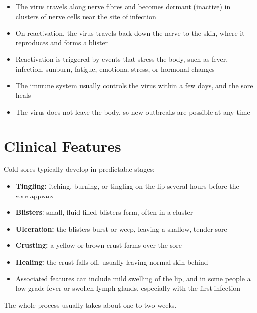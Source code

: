 \begin{itemize}
    \item The virus travels along nerve fibres and becomes dormant (inactive) in clusters of nerve cells near the site of infection
    \item On reactivation, the virus travels back down the nerve to the skin, where it reproduces and forms a blister
    \item Reactivation is triggered by events that stress the body, such as fever, infection, sunburn, fatigue, emotional stress, or hormonal changes
    \item The immune system usually controls the virus within a few days, and the sore heals
    \item The virus does not leave the body, so new outbreaks are possible at any time
\end{itemize}

\section*{Clinical Features}
Cold sores typically develop in predictable stages:

\begin{itemize}
    \item \textbf{Tingling:} itching, burning, or tingling on the lip several hours before the sore appears
    \item \textbf{Blisters:} small, fluid-filled blisters form, often in a cluster
    \item \textbf{Ulceration:} the blisters burst or weep, leaving a shallow, tender sore
    \item \textbf{Crusting:} a yellow or brown crust forms over the sore
    \item \textbf{Healing:} the crust falls off, usually leaving normal skin behind
    \item Associated features can include mild swelling of the lip, and in some people a low-grade fever or swollen lymph glands, especially with the first infection
\end{itemize}

The whole process usually takes about one to two weeks.

